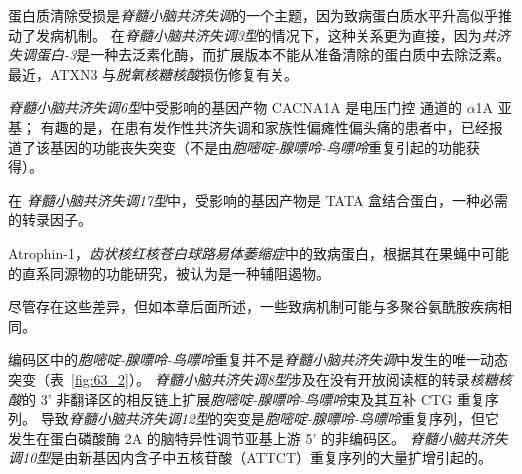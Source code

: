 蛋白质清除受损是\textit{脊髓小脑共济失调}的一个主题，因为致病蛋白质水平升高似乎推动了发病机制。
在\textit{脊髓小脑共济失调3型}的情况下，这种关系更为直接，因为\textit{共济失调蛋白-3}是一种去泛素化酶，而扩展版本不能从准备清除的蛋白质中去除泛素。
最近，ATXN3 与\textit{脱氧核糖核酸}损伤修复有关。


\textit{脊髓小脑共济失调6型}中受影响的基因产物 CACNA1A 是电压门控  通道的 $\alpha$1A 亚基；
有趣的是，在患有发作性共济失调和家族性偏瘫性偏头痛的患者中，已经报道了该基因的功能丧失突变（不是由\textit{胞嘧啶-腺嘌呤-鸟嘌呤}重复引起的功能获得）。


在 \textit{脊髓小脑共济失调17型}中，受影响的基因产物是 TATA 盒结合蛋白，一种必需的转录因子。


Atrophin-1，\textit{齿状核红核苍白球路易体萎缩症}中的致病蛋白，根据其在果蝇中可能的直系同源物的功能研究，被认为是一种辅阻遏物。


尽管存在这些差异，但如本章后面所述，一些致病机制可能与多聚谷氨酰胺疾病相同。


编码区中的\textit{胞嘧啶-腺嘌呤-鸟嘌呤}重复并不是\textit{脊髓小脑共济失调}中发生的唯一动态突变（表~\ref{fig:63_2}）。
\textit{脊髓小脑共济失调8型}涉及在没有开放阅读框的转录\textit{核糖核酸}的 3' 非翻译区的相反链上扩展\textit{胞嘧啶-腺嘌呤-鸟嘌呤}束及其互补 CTG 重复序列。
导致\textit{脊髓小脑共济失调12型}的突变是\textit{胞嘧啶-腺嘌呤-鸟嘌呤}重复序列，但它发生在蛋白磷酸酶 2A 的脑特异性调节亚基上游 5' 的非编码区。
\textit{脊髓小脑共济失调10型}是由新基因内含子中五核苷酸（ATTCT）重复序列的大量扩增引起的。


